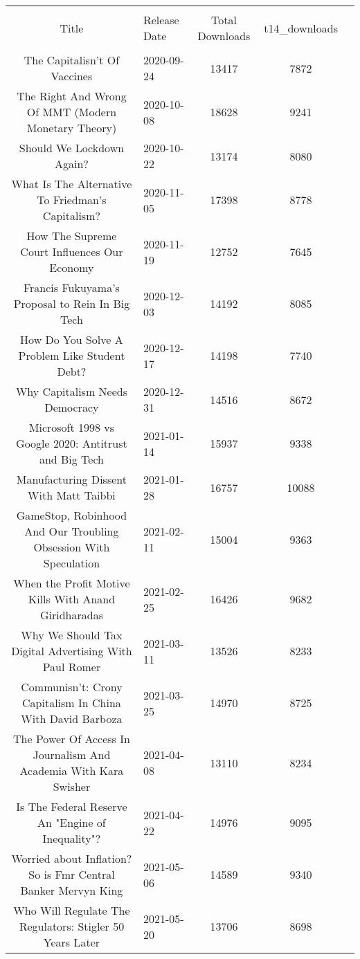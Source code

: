 \begin{table}[!htbp] \centering 
    \caption{} 
    \label{} 
  \begin{tabular}{@{\extracolsep{5pt}} clccc} 
  \\[-1.8ex]\hline 
  \hline \\[-1.8ex] 
  Title & Release Date & Total Downloads & t14\_downloads \\ 
  \hline \\[-1.8ex] 
  The Capitalisn't Of Vaccines & 2020-09-24 & 13417 & 7872 \\ 
  The Right And Wrong Of MMT (Modern Monetary Theory) & 2020-10-08 & 18628 & 9241 \\ 
  Should We Lockdown Again? & 2020-10-22 & 13174 & 8080 \\ 
  What Is The Alternative To Friedman's Capitalism? & 2020-11-05 & 17398 & 8778 \\ 
  How The Supreme Court Influences Our Economy & 2020-11-19 & 12752 & 7645 \\ 
  Francis Fukuyama’s Proposal to Rein In Big Tech & 2020-12-03 & 14192 & 8085 \\ 
  How Do You Solve A Problem Like Student Debt? & 2020-12-17 & 14198 & 7740 \\ 
  Why Capitalism Needs Democracy & 2020-12-31 & 14516 & 8672 \\ 
  Microsoft 1998 vs Google 2020: Antitrust and Big Tech & 2021-01-14 & 15937 & 9338 \\ 
  Manufacturing Dissent With Matt Taibbi & 2021-01-28 & 16757 & 10088 \\ 
  GameStop, Robinhood And Our Troubling Obsession With Speculation & 2021-02-11 & 15004 & 9363 \\ 
  When the Profit Motive Kills With Anand Giridharadas & 2021-02-25 & 16426 & 9682 \\ 
  Why We Should Tax Digital Advertising With Paul Romer & 2021-03-11 & 13526 & 8233 \\ 
  Communisn’t: Crony Capitalism In China With David Barboza & 2021-03-25 & 14970 & 8725 \\ 
  The Power Of Access In Journalism And Academia With Kara Swisher & 2021-04-08 & 13110 & 8234 \\ 
  Is The Federal Reserve An "Engine of Inequality"? & 2021-04-22 & 14976 & 9095 \\ 
  Worried about Inflation? So is Fmr Central Banker Mervyn King & 2021-05-06 & 14589 & 9340 \\ 
  Who Will Regulate The Regulators: Stigler 50 Years Later & 2021-05-20 & 13706 & 8698 \\ 

\end{tabular}
\end{table}
